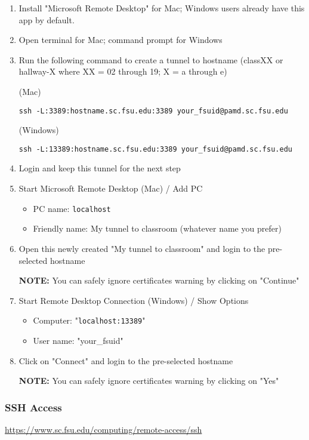 \documentclass[12pt,a4paper]{article}
\begin{document}
\begin{enumerate}
    \item Install "Microsoft Remote Desktop" for Mac; Windows users already have this app by default.
    \item Open terminal for Mac; command prompt for Windows
    \item Run the following command to create a tunnel to hostname (classXX or hallway-X where XX = 02 through 19; X = a through e)
    
    (Mac)
    
    \texttt{ssh -L:3389:hostname.sc.fsu.edu:3389 your\_fsuid@pamd.sc.fsu.edu}
    
    (Windows)
    
    \texttt{ssh -L:13389:hostname.sc.fsu.edu:3389 your\_fsuid@pamd.sc.fsu.edu}
    
    \item Login and keep this tunnel for the next step
    \item Start Microsoft Remote Desktop (Mac) / Add PC
    \begin{itemize}
        \item PC name: \texttt{localhost}
        \item Friendly name: My tunnel to classroom (whatever name you prefer)
    \end{itemize}
    \item Open this newly created "My tunnel to classroom" and login to the pre-selected hostname
    
    \textbf{NOTE:} You can safely ignore certificates warning by clicking on "Continue"
    
    \item Start Remote Desktop Connection (Windows) / Show Options
    \begin{itemize}
        \item Computer: "\texttt{localhost:13389}"
        \item User name: "your\_fsuid"
    \end{itemize}
    \item Click on "Connect" and login to the pre-selected hostname
    
    \textbf{NOTE:} You can safely ignore certificates warning by clicking on "Yes"
\end{enumerate}

\subsubsection{SSH Access}
\url{https://www.sc.fsu.edu/computing/remote-access/ssh}
\end{document}
